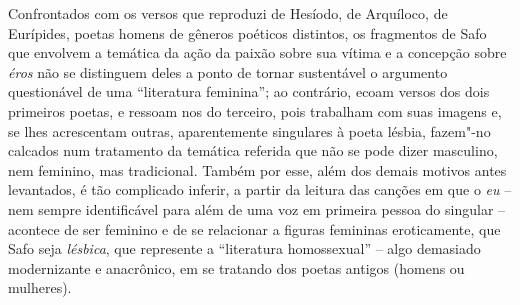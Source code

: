 Confrontados com os versos que reproduzi de Hesíodo, de Arquíloco, de Eurípides,
poetas homens de gêneros poéticos distintos, os fragmentos de Safo que envolvem
a temática da ação da paixão sobre sua vítima e a concepção sobre \textit{éros}
não se distinguem deles a ponto de tornar sustentável o argumento questionável
de uma “literatura feminina”; ao contrário, ecoam versos
dos dois primeiros poetas, e ressoam nos do terceiro, pois trabalham com
suas imagens e, se lhes acrescentam outras, aparentemente singulares à poeta
lésbia, fazem"-no calcados num tratamento da \pagebreak temática referida que não se pode
dizer masculino, nem feminino, mas tradicional. Também por esse, além dos demais motivos antes levantados, é tão complicado
inferir, a partir da leitura das canções em que o \textit{eu} -- nem sempre
identificável para além de uma voz em primeira pessoa do singular -- acontece de ser
feminino e de se relacionar a figuras femininas eroticamente, que Safo seja
\textit{lésbica}, que represente a “literatura homossexual” -- algo
demasiado modernizante e anacrônico, em se tratando dos poetas antigos
(homens ou mulheres).

